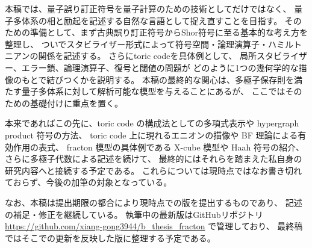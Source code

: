 \documentclass[../master.tex]{subfiles}
\begin{document}
\bigskip
本稿では、量子誤り訂正符号を量子計算のための技術としてだけではなく、
量子多体系の相と励起を記述する自然な言語として捉え直すことを目指す。
そのための準備として、まず古典誤り訂正符号からShor符号に至る基本的な考え方を整理し、
ついでスタビライザー形式によって符号空間・論理演算子・ハミルトニアンの関係を記述する。
さらにtoric codeを具体例として、
局所スタビライザー、エラー鎖、論理演算子、復号と閾値の問題が
どのように1つの幾何学的な描像のもとで結びつくかを説明する。
本稿の最終的な関心は、多極子保存則を満たす量子多体系に対して解析可能な模型を与えることにあるが、
ここではそのための基礎付けに重点を置く。

本来であればこの先に、toric code の構成法としての多項式表示や hypergraph product 符号の方法、
toric code 上に現れるエニオンの描像や BF 理論による有効作用の表式、
fracton 模型の具体例である X-cube 模型や Haah 符号の紹介、
さらに多極子代数による記述を続けて、
最終的にはそれらを踏まえた私自身の研究内容へと接続する予定である。
これらについては現時点ではなお書き切れておらず、今後の加筆の対象となっている。

なお、本稿は提出期限の都合により現時点での版を提出するものであり、
記述の補足・修正を継続している。
執筆中の最新版はGitHubリポジトリ
\url{https://github.com/xiang-gong3944/b_thesis_fracton}
で管理しており、
最終稿ではそこでの更新を反映した版に整理する予定である。
\end{document}
